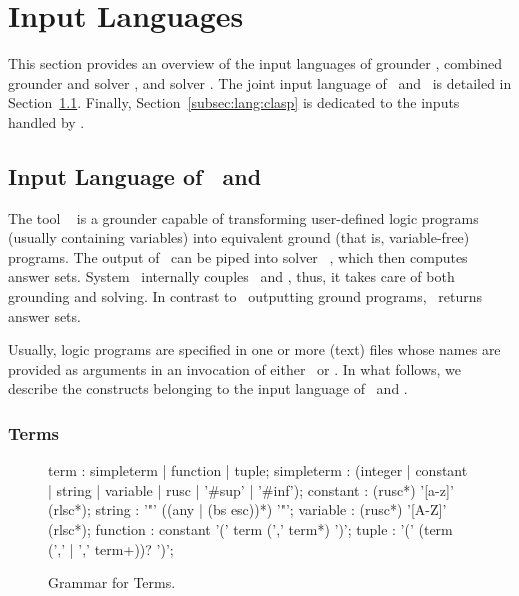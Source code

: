 \section{Input Languages}\label{sec:language}

This section provides an overview of the input languages of
grounder \gringo, combined grounder and solver \clingo, and solver \clasp.
The joint input language of \gringo\ and \clingo\ is detailed in
Section~\ref{subsec:lang:gringo}.
Finally, Section~\ref{subsec:lang:clasp} is dedicated to the inputs handled by \clasp.

\subsection{Input Language of \gringo\ and \clingo}\label{subsec:lang:gringo}

The tool \gringo~\cite{gescth07a} is a grounder capable of transforming
user-defined logic programs (usually containing variables) into
equivalent ground (that is, variable-free) programs.
The output of \gringo\ can be piped into solver \clasp~\cite{gekanesc07a,gekasc09c},
which then computes answer sets.
System \clingo\ internally couples \gringo\ and \clasp, thus,
it takes care of both grounding and solving.
In contrast to \gringo\ outputting ground programs,
\clingo\ returns answer sets.

Usually, logic programs are specified in one or more (text) files whose names are
provided as arguments in an invocation of either \gringo\ or \clingo.
In what follows, 
we describe the constructs belonging to the input language of \gringo\ and \clingo.

\subsubsection{Terms}\label{subsec:gringo:terms}

\begin{figure}
\railnontermfont{\rmfamily\itshape}%
\begin{rail}
  term        : simpleterm | function | tuple;
  simpleterm  : (integer | constant | string | variable | rusc | '\#sup' | '\#inf');
  constant    : (rusc*) '[a-z]' (rlsc*);
  string      : '"' ((any | (bs esc))*) '"';
  variable    : (rusc*) '[A-Z]' (rlsc*);
  function    : constant '(' term (',' term*) ')';
  tuple       :          '(' (term (',' | ',' term+))? ')';
\end{rail}
\caption{Grammar for Terms.\label{fig:terms}}
\end{figure}

